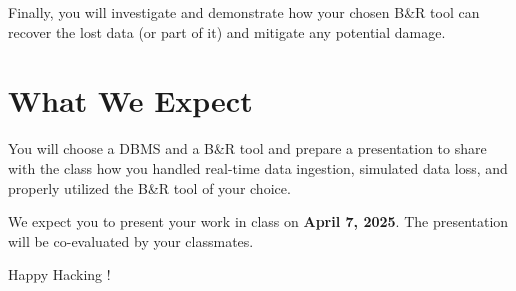 \documentclass{article}
\begin{document}
Finally, you will investigate and demonstrate how your chosen B\&R tool can recover the lost data (or part of it) and mitigate any potential damage.

\section{What We Expect}
You will choose a DBMS and a B\&R tool and prepare a presentation to share with the class how you handled real-time data ingestion, simulated data loss, and properly utilized the B\&R tool of your choice.

We expect you to present your work in class on \textbf{April 7, 2025}. The presentation will be co-evaluated by your classmates.

\vspace{5mm}
Happy Hacking !
\end{document}

